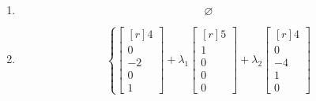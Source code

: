 \documentclass[12pt]{article}
\begin{document}
\begin{enumerate}
\[+\lambda_{1}\begin{bmatrix*}[r]4\\4\\1\\0\\0\\0\\0\\0\end{bmatrix*}
+\lambda_{2}\begin{bmatrix*}[r]2\\-2\\0\\1\\0\\0\\0\\0\end{bmatrix*}
+\lambda_{3}\begin{bmatrix*}[r]3\\-1\\0\\0\\-3\\-1\\1\\0\end{bmatrix*}
+\lambda_{4}\begin{bmatrix*}[r]2\\3\\0\\0\\5\\1\\0\\1\end{bmatrix*}
\;:\;\lambda_{1},\lambda_{2},\lambda_{3},\lambda_{4}\in\mathbb{R}\right\}
\]
\item\[\varnothing\]
\item\[\left\{\begin{bmatrix*}[r]4\\0\\-2\\0\\1\end{bmatrix*}
+\lambda_{1}\begin{bmatrix*}[r]5\\1\\0\\0\\0\end{bmatrix*}
+\lambda_{2}\begin{bmatrix*}[r]4\\0\\-4\\1\\0\end{bmatrix*}
\]
\end{enumerate}
\end{document}
